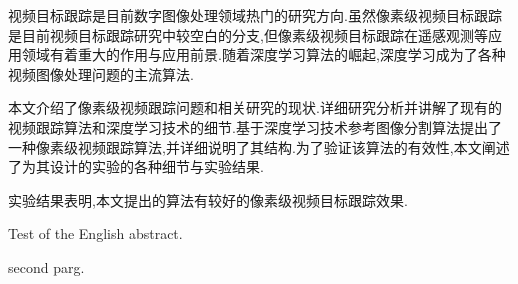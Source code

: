 
\begin{cabstract}
	视频目标跟踪是目前数字图像处理领域热门的研究方向.虽然像素级视频目标跟踪是目前视频目标跟踪研究中较空白的分支,但像素级视频目标跟踪在遥感观测等应用领域有着重大的作用与应用前景.随着深度学习算法的崛起,深度学习成为了各种视频图像处理问题的主流算法.
	\par
	本文介绍了像素级视频跟踪问题和相关研究的现状.详细研究分析并讲解了现有的视频跟踪算法和深度学习技术的细节.基于深度学习技术参考图像分割算法提出了一种像素级视频跟踪算法,并详细说明了其结构.为了验证该算法的有效性,本文阐述了为其设计的实验的各种细节与实验结果.
	\par
	实验结果表明,本文提出的算法有较好的像素级视频目标跟踪效果.
\end{cabstract}

\begin{eabstract}
	Test of the English abstract.
	\par
	second parg.
\end{eabstract}

